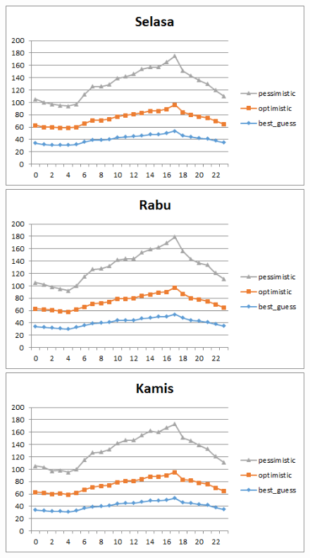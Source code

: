 \begin{figure}[H]
				\centering		
				\includegraphics[]{Gambar/selasasampel115052017.png}
				\includegraphics[]{Gambar/rabusampel115052017.png}
				\includegraphics[]{Gambar/kamissampel115052017.png}
\end{figure}			
			
